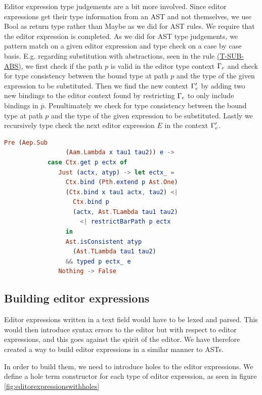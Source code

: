 Editor expression type judgements are a bit more involved. Since
editor expressions get their type information from an AST and not
themselves, we use Bool as return type rather than Maybe as we did for
AST rules. We require that the editor expression is completed. As we
did for AST type judgements, we pattern match on a given editor
expression and type check on a case by case basis.  E.g. regarding
substitution with abstractions, seen in the rule
\hyperref[fig:edttyperules]{(T-SUB-ABS)}, we first check if the path $p$ is
valid in the editor type context $\Gamma_{e}$ and check for type consistency
between the bound type at path $p$ and the type of the given expression to be
substituted. Then we find the new context $\Gamma_{e}'$ by adding two new bindings
to the editor context found by restricting $\Gamma_{e}$ to only include bindings
in $\bar{p}$. Penultimately we check for type consistency between the bound
type at path $p$ and the type of the given expression to be substituted. Lastly
we recursively type check the next editor expression $E$ in the context
$\Gamma_{e}'$.
\begin{lstlisting}[language=elm,%
                    gobble=8,%
                    mathescape,%
                    ]
        Pre (Aep.Sub
                 (Aam.Lambda x tau1 tau2)) e ->
            case Ctx.get p ectx of
               Just (actx, atyp) -> let ectx_ =
                 Ctx.bind (Pth.extend p Ast.One)
                 (Ctx.bind x tau1 actx, tau2) <|
                   Ctx.bind p
                   (actx, Ast.TLambda tau1 tau2)
                     <| restrictBarPath p ectx
                 in
                 Ast.isConsistent atyp
                   (Ast.TLambda tau1 tau2)
                 && typed p ectx_ e
               Nothing -> False
\end{lstlisting}

\subsection{Building editor expressions}

Editor expressions written in a text field would have to be lexed and
parsed.  This would then introduce syntax errors to the editor but
with respect to editor expressions, and this goes against the spirit
of the editor. We have therefore created a way to build editor
expressions in a similar manner to ASTs.

In order to build them, we need to introduce holes to the editor
expressions. We define a hole term constructor for each type of editor
expression, as seen in figure \ref{fig:editorexpressionswithholes}

